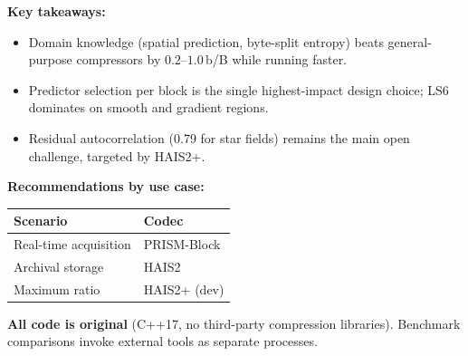 \documentclass[a0paper,landscape]{baposter}
\newcommand{\compactlist}{\setlength{\itemsep}{0pt}\setlength{\parskip}{0pt}\setlength{\topsep}{1pt}}
\newcommand{\tightsection}{\vspace{0.35em}}
\begin{document}
\begin{poster}
{  \textbf{Key takeaways:}
  \begin{itemize}\compactlist
    \item Domain knowledge (spatial prediction, byte-split entropy) beats
          general-purpose compressors by $0.2$--$1.0$\,b/B while running faster.
    \item Predictor selection per block is the single highest-impact design
          choice; LS6 dominates on smooth and gradient regions.
    \item Residual autocorrelation (0.79 for star fields) remains the main
          open challenge, targeted by HAIS2+.
  \end{itemize}

  \tightsection
  \textbf{Recommendations by use case:}
  \begin{center}\scriptsize
  \begin{tabular}{@{}ll@{}}
    \toprule
    \textbf{Scenario} & \textbf{Codec}\\
    \midrule
    Real-time acquisition & PRISM-Block\\
    Archival storage & HAIS2\\
    Maximum ratio & HAIS2+ (dev) \\
    \bottomrule
  \end{tabular}
  \end{center}

  \tightsection
  \textbf{All code is original} (C++17, no third-party compression libraries).
  Benchmark comparisons invoke external tools as separate processes.
}

\end{poster}
\end{document}
